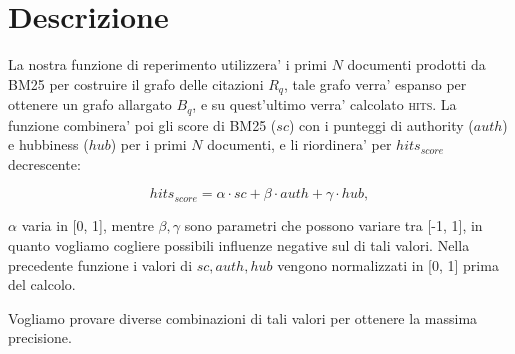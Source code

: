 \documentclass[12pt]{article}
\begin{document}
\maketitle

\section{Descrizione}
La nostra funzione di reperimento utilizzera' i primi $N$ documenti prodotti da BM25 per costruire il grafo delle citazioni $R_q$, tale grafo verra' espanso per ottenere un grafo allargato $B_q$, e su quest'ultimo verra' calcolato \textsc{hits}. La funzione combinera' poi gli score di BM25 ($sc$) con i punteggi di authority ($auth$) e hubbiness ($hub$) per i primi $N$ documenti, e li riordinera' per $hits_{score}$ decrescente:

\[ hits_{score} =  \alpha \cdot sc + \beta \cdot auth + \gamma \cdot hub,\]

$\alpha$ varia in [0, 1],  mentre $\beta, \gamma$ sono parametri che possono variare tra [-1, 1], in quanto vogliamo cogliere possibili influenze negative sul di tali valori. Nella precedente funzione i valori di $sc, auth, hub$ vengono normalizzati in [0, 1] prima del calcolo. 

 Vogliamo provare diverse combinazioni di tali valori per ottenere la massima precisione.



\end{document}
